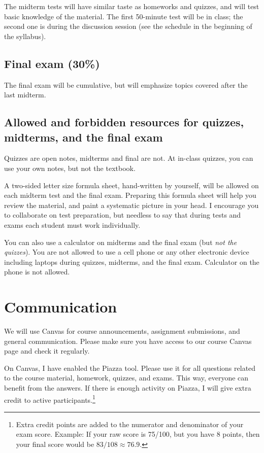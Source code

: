 \documentclass[oneside,11pt]{amsart}
\theoremstyle{definition}
\begin{document}
The midterm tests will have similar taste as homeworks and quizzes, and will test basic knowledge of the material. The first 50-minute test will be in class; the second one is during the discussion session (see the schedule in the beginning of the syllabus).

\subsection{Final exam (30\%)}
The final exam will be cumulative, but will emphasize topics covered after the last midterm.

\subsection*{Allowed and forbidden resources for quizzes, midterms, and the final exam}

Quizzes are open notes, midterms and final are not. At in-class quizzes, you can use your own notes, but not the textbook.

A two-sided letter size formula sheet, hand-written by yourself, will be allowed on each midterm test and the final exam. Preparing this formula sheet will help you review the material, and paint a systematic picture in your head. I encourage you to collaborate on test preparation, but needless to say that during tests and exams each student must work individually.

You can also use a calculator on midterms and the final exam (but \emph{not the quizzes}). You are not allowed to use a cell phone or any other electronic device including laptops during quizzes, midterms, and the final exam. Calculator on the phone is not allowed.
	
\section{Communication} \label{comm} 

We will use Canvas for course announcements, assignment submissions, and general communication. Please make sure you have access to our course Canvas page and check it regularly.


On Canvas, I have enabled the Piazza tool. Please use it for all questions related to the course material, homework, quizzes, and exams. This way, everyone can benefit from the answers. If there is enough activity on Piazza, I will give extra credit to active participants.\footnote{Extra credit points are added to the numerator and denominator of your exam score. Example: If your raw score is 75/100, but you have 8 points, then your final score would be $83/108 \approx 76.9$.}
\end{document}
